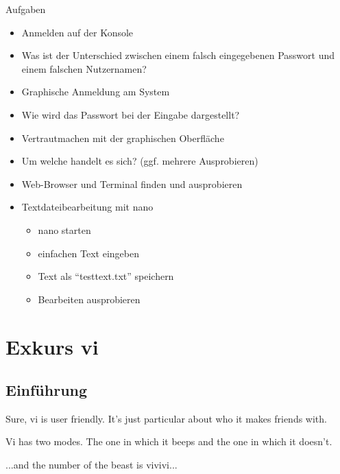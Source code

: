\documentclass[aspectratio=43]{beamer}
\begin{document}
\begin{frame}{Aufgaben}
  \begin{itemize}
    \item Anmelden auf der Konsole
    \item Was ist der Unterschied zwischen einem falsch eingegebenen Passwort und einem falschen Nutzernamen?
    \item Graphische Anmeldung am System
    \item Wie wird das Passwort bei der Eingabe dargestellt?
    \item Vertrautmachen mit der graphischen Oberfläche
    \item Um welche handelt es sich? (ggf. mehrere Ausprobieren)
    \item Web-Browser und Terminal finden und ausprobieren
    \item Textdateibearbeitung mit nano
    \begin{itemize}
      \item nano starten
      \item einfachen Text eingeben
      \item Text als ``testtext.txt'' speichern
      \item Bearbeiten ausprobieren
    \end{itemize}

  \end{itemize}

\end{frame}


\section{Exkurs vi}
\subsection{Einf\"uhrung}
\begin{frame} 
        \begin{block}{} 
        \begin{center}
        Sure, vi is user friendly. It's just particular about who it makes friends with.
        \end{center}
        \end{block}

        \begin{exampleblock}{} 
        \begin{center}  
        Vi has two modes. The one in which it beeps and the one in which it doesn't.
        \end{center}
        \end{exampleblock}
        \begin{alertblock}{} 
        \begin{center}  
        ...and the number of the beast is vivivi...
        \end{center}
        \end{alertblock}        
\end{frame}
\end{document}
